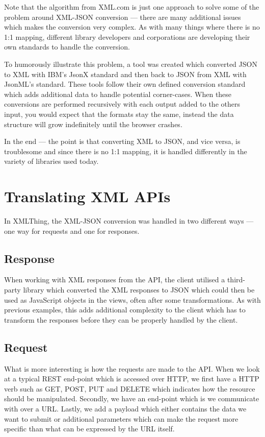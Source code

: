 \documentclass{cslthse-msc}
\begin{document}
Note that the algorithm from XML.com is just one approach to solve some of the problem around XML-JSON conversion --- there are many additional issues which makes the conversion very complex. As with many things where there is no 1:1 mapping, different library developers and corporations are developing their own standards to handle the conversion.

To humorously illustrate this problem, a tool was created\cite{jsonx_jsonml} which converted JSON to XML with IBM's JsonX standard and then back to JSON from XML with JsonML's\cite{jsonml} standard. These tools follow their own defined conversion standard which adds additional data to handle potential corner-cases. When these conversions are performed recursively with each output added to the others input, you would expect that the formats stay the same, instead the data structure will grow indefinitely until the browser crashes.

In the end --- the point is that converting XML to JSON, and vice versa, is troublesome and since there is no 1:1 mapping, it is handled differently in the variety of libraries used today.

\section{Translating XML APIs}
In XMLThing, the XML-JSON conversion was handled in two different ways --- one way for requests and one for responses.

\subsection{Response}

When working with XML responses from the API, the client utilised a third-party library which converted the XML responses to JSON which could then be used as JavaScript objects in the views, often after some transformations. As with previous examples, this adds additional complexity to the client which has to transform the responses before they can be properly handled by the client.

\subsection{Request}
What is more interesting is how the requests are made to the API. When we look at a typical REST end-point which is accessed over HTTP, we first have a HTTP verb such as GET, POST, PUT and DELETE which indicates how the resource should be manipulated. Secondly, we have an end-point which is we communicate with over a URL. Lastly, we add a payload which either contains the data we want to submit or additional parameters which can make the request more specific than what can be expressed by the URL itself.
\end{document}
